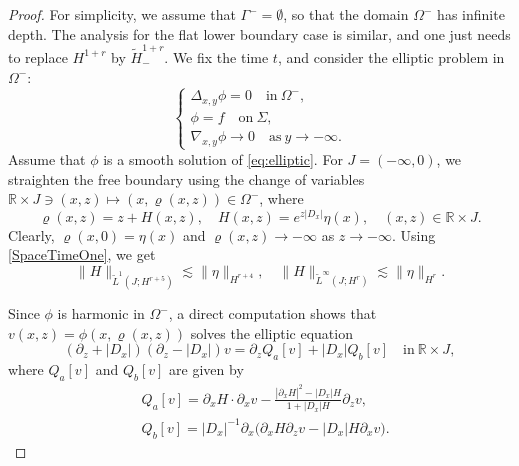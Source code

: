 \documentclass[12pt]{amsart}
\theoremstyle{definition}
\numberwithin{equation}{section}
\newcommand{\p}{\partial}
\newcommand{\R}{\mathbb{R}}
\begin{document}
\begin{proof}
 For simplicity, we assume that $\Gamma^- = \emptyset$, so that the domain $\Omega^-$ has infinite depth.
 The analysis for the flat lower boundary case is similar, and one just needs to replace $H^{1+r}$ by $\widetilde{H}^{1+r}_-$.
 We fix the time $t$, and consider the elliptic problem in $\Omega^-$:
 \begin{equation}\label{eq:elliptic}
\begin{cases}
\Delta_{x, y} \phi=0\quad\text{in}~\Omega^-,\\
\phi=f\quad\text{on}~\Sigma,\\
\nabla_{x, y}\phi\to 0\quad\text{as}~y\to -\infty.
\end{cases}
\end{equation}
Assume that $\phi$ is a smooth solution of \eqref{eq:elliptic}. For $J=(-\infty, 0)$, we straighten the free boundary  using the change of variables $\R\times J\ni (x, z)\mapsto (x, \varrho(x, z))\in \Omega^-$, where
\begin{equation*}%
\varrho(x, z)=z+H(x, z),\quad H(x, z)=e^{z|D_x|}\eta(x),\quad (x, z)\in \R\times J.
\end{equation*}
Clearly, $\varrho(x, 0)=\eta(x)$ and $\varrho(x,z)\to -\infty$ as $z\to -\infty$.
Using \eqref{SpaceTimeOne}, we get
\begin{equation} \label{HRhoBound}
 \|H \|_{\widetilde{L} ^1(J; H^{r+5})} \lesssim \| \eta\|_{ H^{r+4}}, \quad  \|H \|_{\widetilde{L} ^\infty(J; H^{r})} \lesssim \| \eta\|_{ H^{r}}.
\end{equation}

Since $\phi$ is harmonic in $\Omega^-$, a direct computation shows that $v(x, z)=\phi(x,\varrho(x, z))$ solves the elliptic equation
\begin{equation}\label{eq:Deltav}
(\p_z+|D_x|)(\p_z-|D_x|)v=\partial_zQ_a[v]+|D_x|Q_b[v]\quad\text{in} ~\R \times J,
\end{equation}
 where $Q_a[v]$ and $Q_b[v]$ are given by
\begin{equation*}%
\begin{aligned}
&Q_a[v]=\partial_xH\cdot \partial_xv-\frac{|\partial_xH|^2-|D_x|H}{1+|D_x|H}\partial_zv,\\
&Q_b[v]=|D_x|^{-1}\partial_x\big(\partial_xH\partial_zv-|D_x|H\partial_xv\big).
\end{aligned}
\end{equation*}


\end{proof}
\end{document}
